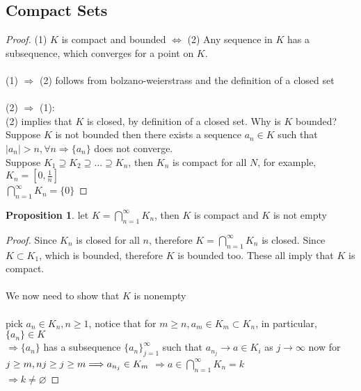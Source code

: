 \documentclass[12pt]{article}
\theoremstyle{plain}
\theoremstyle{definition}
\newtheorem{proposition}[theorem]{Proposition}
\begin{document}
\subsection{Compact Sets}
\begin{proof}
	(1) $K$ is compact and bounded $\Longleftrightarrow$ (2) Any sequence in $K$ has a subsequence, which converges for a point on $K$.\\
	\\
	(1) $\Longrightarrow$ (2) follows from bolzano-weierstrass and the definition of a closed set\\
	\\
	(2) $\Longrightarrow$ (1):\\
	(2) implies that $K$ is closed, by definition of a closed set. Why is $K$ bounded? Suppose $K$ is not bounded then there exists a sequence $a_n \in K$ such that $|a_n| > n, \forall n \Longrightarrow \{ a_n \}$ does not converge.\\
	Suppose $K_1 \supseteq K_2 \supseteq ... \supseteq K_n$, then $K_n$ is compact for all $N$, for example, $K_n = [0, \frac{1}{n}]$
	\\
	$\bigcap^\infty_{n=1} K_n = \{ 0 \}$
\end{proof}

\begin{proposition}
	let $K = \bigcap^\infty_{n=1} K_n$, then $K$ is compact and $K$ is not empty
\end{proposition}

\begin{proof}
	Since $K_n$ is closed for all $n$, therefore $K = \bigcap^\infty_{n=1} K_n$ is closed. Since $K \subset K_1$, which is bounded, therefore $K$ is bounded too. These all imply that $K$ is compact.\\
	\\
	We now need to show that $K$ is nonempty\\
	\\
	pick $a_n \in K_n, n \geq 1$, notice that for $m \geq n, a_m \in K_m \subset K_n$, in particular, $\{ a_n \} \in K$\\
	$\Longrightarrow \{ a_n \} $ has a subsequence $\{ a_n \}^\infty_{j=1} $ such that $a_{n_j} \to a \in K_i$ as $j\to\infty$ now for $j \geq m, nj \geq j \geq m\\ \Longrightarrow a_{n_j} \in K_m $
	$\Longrightarrow a \in \bigcap^\infty_{n=1} K_n = k$\\
	$\Longrightarrow  k \neq \varnothing$
\end{proof}
\end{document}
